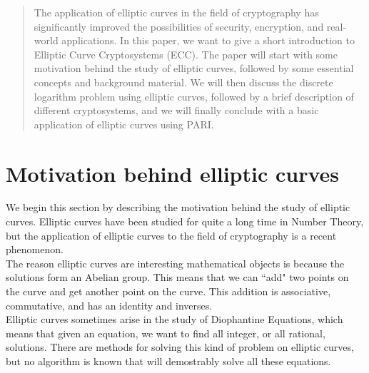 \documentclass[12pt]{article}
\begin{document}
\maketitle


\begin{abstract}

\noindent The application of elliptic curves in the field of cryptography has significantly improved the possibilities of security, encryption, and real-world applications. In this paper, we want to give a short introduction to Elliptic Curve Cryptosystems (ECC). The paper will start with some motivation behind the study of elliptic curves, followed by some essential concepts and background material. We will then discuss the discrete logarithm problem using elliptic curves, followed by a brief description of different cryptosystems, and we will finally conclude with a basic application of elliptic curves using PARI. 

\end{abstract}



\section{Motivation behind elliptic curves}

We begin this section by describing the motivation behind the study of elliptic curves. Elliptic curves have been studied for quite a long time in Number Theory, but the application of elliptic curves to the field of cryptography is a recent phenomenon. \\

The reason elliptic curves are interesting mathematical objects is because the solutions form an Abelian group.  This means that we can ``add" two points on the curve and get another point on the curve.  This addition is associative, commutative, and has an identity and inverses. \\

Elliptic curves sometimes arise in the study of Diophantine Equations, which means that given an equation, we want to find all integer, or all rational, solutions.  There are methods for solving this kind of problem on elliptic curves, but no algorithm is known that will demostrably solve all these equations.\\
\end{document}
